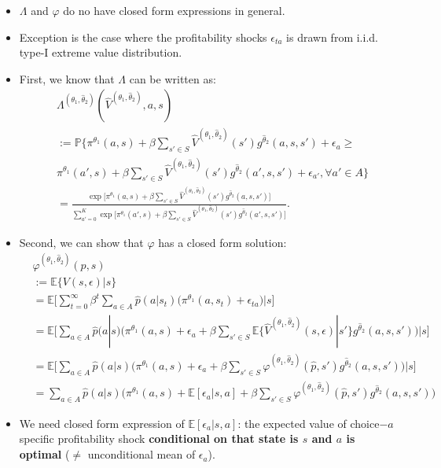 \documentclass[
]{book}
\providecommand{\tightlist}{%
  \setlength{\itemsep}{0pt}\setlength{\parskip}{0pt}}
\begin{document}
\begin{itemize}
\tightlist
\item
  \(\Lambda\) and \(\varphi\) do no have closed form expressions in general.
\item
  Exception is the case where the profitability shocks \(\epsilon_{ta}\) is drawn from i.i.d. type-I extreme value distribution.
\item
  First, we know that \(\Lambda\) can be written as:
  \begin{equation}
  \begin{split}
  &\Lambda^{(\theta_1, \hat{\theta}_2)}(\hat{V}^{(\theta_1, \hat{\theta}_2)}, a, s)\\
  &:= \mathbb{P}\Bigg\{\pi^{\theta_1}(a , s) + \beta \sum_{s' \in S} \hat{V}^{(\theta_1, \hat{\theta}_2)}(s') g^{\hat{\theta}_2}(a, s, s') + \epsilon_a \ge\\
  &\pi^{\theta_1}(a' , s) + \beta \sum_{s' \in S} \hat{V}^{(\theta_1, \hat{\theta}_2)}(s') g^{\hat{\theta}_2}(a', s, s') + \epsilon_{a'}, \forall a' \in A \Bigg\}\\
  &=\frac{\exp\Big[\pi^{\theta_1}(a , s) + \beta \sum_{s' \in S}\hat{V}^{(\theta_1, \hat{\theta}_2)}(s') g^{\hat{\theta}_2}(a, s, s')\Big]}{\sum_{a' = 0}^K \exp\Big[\pi^{\theta_1}(a' , s) + \beta \sum_{s' \in S} \hat{V}^{(\theta_1, \hat{\theta}_2)}(s') g^{\hat{\theta}_2}(a', s, s') \Big]}.
  \end{split}
  \end{equation}
\item
  Second, we can show that \(\varphi\) has a closed form solution:
  \begin{equation}
  \begin{split}
  &\varphi^{(\theta_1, \hat{\theta}_2)}(p, s)\\
  &:= \mathbb{E}\{V(s, \epsilon)|s\}\\
  &= \mathbb{E}\Bigg[ \sum_{t = 0}^\infty \beta^t \sum_{a \in A}\hat{p}(a|s_t)\Bigg(\pi^{\theta_1}(a, s_t) + \epsilon_{ta}\Bigg)\Bigg|s\Bigg]\\
  &=\mathbb{E}\Bigg[\sum_{a \in A}\hat{p}(a|s)\Bigg(\pi^{\theta_1}(a, s) + \epsilon_{a} + \beta \sum_{s' \in S} \mathbb{E}\{\hat{V}^{(\theta_1, \hat{\theta}_2)}(s, \epsilon)|s'\} g^{\hat{\theta}_2}(a, s, s')  \Bigg)\Bigg|s\Bigg]\\
  &=\mathbb{E}\Bigg[\sum_{a \in A}\hat{p}(a|s)\Bigg(\pi^{\theta_1}(a, s) + \epsilon_{a} + \beta \sum_{s' \in S} \varphi^{(\theta_1, \hat{\theta}_2)}(\hat{p}, s') g^{\hat{\theta}_2}(a, s, s')  \Bigg)\Bigg|s\Bigg]\\
  &=\sum_{a \in A}\hat{p}(a|s)\Bigg(\pi^{\theta_1}(a, s) + \mathbb{E}[\epsilon_{a}|s, a] + \beta \sum_{s' \in S} \varphi^{(\theta_1, \hat{\theta}_2)}(\hat{p}, s') g^{\hat{\theta}_2}(a, s, s')  \Bigg)
  \end{split}
  \end{equation}
\item
  We need closed form expression of \(\mathbb{E}[\epsilon_{a}|s, a]\): the expected value of choice\(-a\) specific profitability shock \textbf{conditional on that state is \(s\) and \(a\) is optimal} (\(\neq\) unconditional mean of \(\epsilon_a\)).
\end{itemize}
\end{document}
